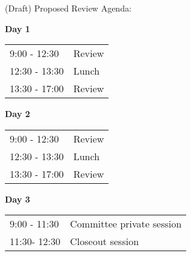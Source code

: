 \documentclass[DM,lsstdraft,STS,toc]{lsstdoc}
\begin{document}
(Draft) Proposed Review Agenda:

\textbf{Day 1} \\
\begin{tabular}[htb]{l l}
9:00 - 12:30 & Review \\
12:30 - 13:30 & Lunch \\
13:30 - 17:00 & Review \\
\end{tabular}

\textbf{Day 2} \\
\begin{tabular}[htb]{l l}
9:00 - 12:30 & Review \\
12:30 - 13:30 & Lunch \\
13:30 - 17:00 & Review \\
\end{tabular}

\textbf{Day 3} \\
\begin{tabular}[htb]{l l}
9:00 - 11:30 & Committee private session \\
11:30- 12:30 & Closeout session\\
\end{tabular}

\clearpage
\end{document}
